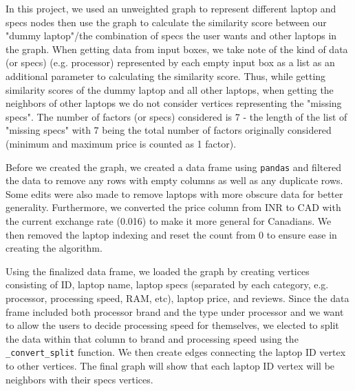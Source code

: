 \documentclass{article}
\begin{document}
In this project, we used an unweighted graph to represent different laptop and specs nodes then use the graph to calculate the similarity score between our "dummy laptop"/the combination of specs the user wants and other laptops in the graph. When getting data from input boxes, we take note of the kind of data (or specs) (e.g. processor) represented by each empty input box as a list as an additional parameter to calculating the similarity score. Thus, while getting similarity scores of the dummy laptop and all other laptops, when getting the neighbors of other laptops we do not consider vertices representing the "missing specs". The number of factors (or specs) considered is 7 - the length of the list of "missing specs" with 7 being the total number of factors originally considered (minimum and maximum price is counted as 1 factor).
\\
\par
Before we created the graph, we created a data frame using \texttt{pandas} and filtered the data to remove any rows with empty columns as well as any duplicate rows. Some edits were also made to remove laptops with more obscure data for better generality. Furthermore, we converted the price column from INR to CAD with the current exchange rate (0.016) to make it more general for Canadians. We then removed the laptop indexing and reset the count from 0 to ensure ease in creating the algorithm.
\\
\par
Using the finalized data frame, we loaded the graph by creating vertices consisting of ID, laptop name, laptop specs (separated by each category, e.g. processor, processing speed, RAM, etc), laptop price, and reviews. Since the data frame included both processor brand and the type under processor and we want to allow the users to decide processing speed for themselves, we elected to split the data within that column to brand and processing speed using the \texttt{\_convert\_split} function. We then create edges connecting the laptop ID vertex to other vertices. The final graph will show that each laptop ID vertex will be neighbors with their specs vertices.
\\
\par
\end{document}
